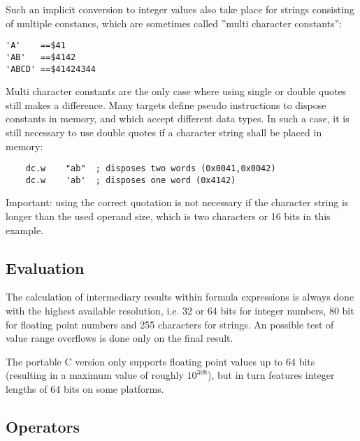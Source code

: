 \documentclass[12pt,twoside]{report}
\begin{document}
Such an implicit conversion to integer values also take place for strings
consisting of multiple constancs, which are sometimes called ''multi
character constants'':
\begin{verbatim}
'A'    ==$41
'AB'   ==$4142
'ABCD' ==$41424344
\end{verbatim}
Multi character constants are the only case where using single or double
quotes still makes a difference.  Many targets define pseudo instructions
to dispose constants in memory, and which accept different data types.
In such a case, it is still necessary to use double quotes if a character
string shall be placed in memory:
\begin{verbatim}
    dc.w    "ab"  ; disposes two words (0x0041,0x0042)
    dc.w    'ab'  ; disposes one word (0x4142)
\end{verbatim}
Important: using the correct quotation is not necessary if the character
string is longer than the used operand size, which is two characters or
16 bits in this example.

\subsection{Evaluation}

The calculation of intermediary results within formula expressions is
always done with the highest available resolution, i.e. 32 or 64 bits for
integer numbers, 80 bit for floating point numbers and 255 characters
for strings.  An possible test of value range overflows is done only
on the final result.

The portable C version  only supports floating
point values up to 64 bits (resulting in a maximum value of roughly
$10^{308}$), but in turn features integer lengths of 64 bits on some
platforms.

\subsection{Operators}
\end{document}

